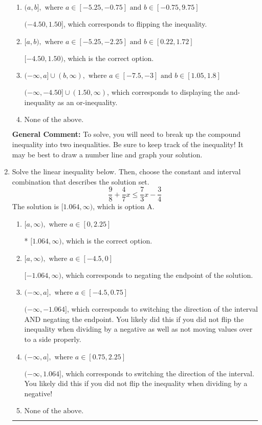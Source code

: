 \documentclass{extbook}[14pt]
\newcommand{\litem}[1]{\item #1

\rule{\textwidth}{0.4pt}}
\begin{document}
\begin{enumerate}
{\begin{enumerate}[label=\Alph*.]
$(-\infty, -4.50) \cup [1.50, \infty)$, which corresponds to displaying the and-inequality as an or-inequality AND flipping the inequality.
\item \( (a, b], \text{ where } a \in [-5.25, -0.75] \text{ and } b \in [-0.75, 9.75] \)

$(-4.50, 1.50]$, which corresponds to flipping the inequality.
\item \( [a, b), \text{ where } a \in [-5.25, -2.25] \text{ and } b \in [0.22, 1.72] \)

$[-4.50, 1.50)$, which is the correct option.
\item \( (-\infty, a] \cup (b, \infty), \text{ where } a \in [-7.5, -3] \text{ and } b \in [1.05, 1.8] \)

$(-\infty, -4.50] \cup (1.50, \infty)$, which corresponds to displaying the and-inequality as an or-inequality.
\item \( \text{None of the above.} \)


\end{enumerate}

\textbf{General Comment:} To solve, you will need to break up the compound inequality into two inequalities. Be sure to keep track of the inequality! It may be best to draw a number line and graph your solution.
}
\litem{
Solve the linear inequality below. Then, choose the constant and interval combination that describes the solution set.
\[ \frac{9}{8} + \frac{4}{7} x \leq \frac{7}{3} x - \frac{3}{4} \]The solution is \( [1.064, \infty) \), which is option A.\begin{enumerate}[label=\Alph*.]
\item \( [a, \infty), \text{ where } a \in [0, 2.25] \)

* $[1.064, \infty)$, which is the correct option.
\item \( [a, \infty), \text{ where } a \in [-4.5, 0] \)

 $[-1.064, \infty)$, which corresponds to negating the endpoint of the solution.
\item \( (-\infty, a], \text{ where } a \in [-4.5, 0.75] \)

 $(-\infty, -1.064]$, which corresponds to switching the direction of the interval AND negating the endpoint. You likely did this if you did not flip the inequality when dividing by a negative as well as not moving values over to a side properly.
\item \( (-\infty, a], \text{ where } a \in [0.75, 2.25] \)

 $(-\infty, 1.064]$, which corresponds to switching the direction of the interval. You likely did this if you did not flip the inequality when dividing by a negative!
\item \( \text{None of the above}. \)


\end{enumerate}}
\end{enumerate}
\end{document}
